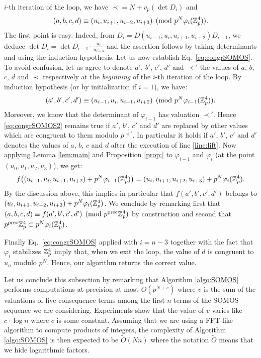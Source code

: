 \documentclass{amsart}
\begin{document}
$i$-th iteration of the loop, we have $\prec = N + v_p(\det D_i)$ and
\begin{equation}
\label{eq:congrSOMOS}
(a, b, c, d) \equiv (u_i, u_{i+1}, u_{i+2}, u_{i+3}) \pmod
{p^N \varphi_i(\mathbb Z_p^4)}.
\end{equation}
The first point is easy. Indeed, from $D_i = D(u_{i-1}, u_i, u_{i+1}, 
u_{i+2}) D_{i-1}$, we deduce $\det D_i = \det D_{i-1} \cdot 
\frac{u_i}{u_{i-3}}$ and the assertion follows by taking determinants
and using the induction hypothesis. 
Let us now establish Eq.~\eqref{eq:congrSOMOS}. To avoid confusion, 
let us agree to denote $a'$, $b'$, $c'$, $d'$ and $\prec'$ the values of 
$a$, $b$, $c$, $d$ and $\prec$ respectively at the \emph{beginning} of 
the $i$-th iteration of the loop. By induction hypothesis (or by 
initialization if $i = 1$), we have:
\begin{equation}
\label{eq:congrSOMOS2}
(a', b', c', d') \equiv (u_{i-1}, u_i, u_{i+1}, u_{i+2}) \pmod
{p^N \varphi_{i-1}(\mathbb Z_p^4)}.
\end{equation}
Moreover, we know that the determinant of $\varphi_{i-1}$ has valuation
$\prec'$. Hence \eqref{eq:congrSOMOS2} remains true if $a'$, $b'$, $c'$
and $d'$ are replaced by other values which are congruent to them modulo
$p^{\prec'}$. In particular it holds if $a'$, $b'$, $c'$ and $d'$ denotes
the values of $a$, $b$, $c$ and $d$ after the execution of line
\ref{line:lift}. Now applying Lemma \ref{lem:main} and Proposition
\ref{prop:} to $\varphi_{i-1}$ and $\varphi_i$ (at the point $(u_0,
u_1, u_2, u_3)$), we get:
$$f\big((u_{i-1}, u_i, u_{i+1}, u_{i+2}) + p^N \varphi_{i-1}(\mathbb Z_p^4)\big)
= (u_i, u_{i+1}, u_{i+2}, u_{i+3}) + p^N \varphi_i(\mathbb Z_p^4).$$
By the discussion above, this implies in particular that $f(a',b',c',d')$
belongs to $(u_i, u_{i+1}, u_{i+2}, u_{i+3}) + p^N \varphi_i(\mathbb Z_p^4)$. We
conclude by remarking first that $(a,b,c,d) \equiv f(a',b',c',d') \pmod 
{p^{\text{\rm prec}} \mathbb Z_p^4}$ by construction and second that $p^{\text{\rm prec}} \mathbb Z_p^4 \subset
p^N \varphi_i(\mathbb Z_p^4)$.

Finally Eq.~\eqref{eq:congrSOMOS} applied with $i = n-3$ together with
the fact that $\varphi_i$ stabilizes $\mathbb Z_p^4$ imply that, when we exit
the loop, the value of $d$ is congruent to $u_n$ modulo $p^N$. Hence,
our algorithm returns the correct value.

\medskip

Let us conclude this subsection by remarking that Algorithm 
\ref{algo:SOMOS} performs computations at precision at most $O(p^{N+v})$ 
where $v$ is the sum of the valuations of five consequence terms among 
the first $n$ terms of the SOMOS sequence we are considering. 
Experiments show that the value of $v$ varies like $c \cdot \log n$ 
where $c$ is some constant. Assuming that we are using a FFT-like 
algorithm to compute products of integers, the complexity of Algorithm 
\ref{algo:SOMOS} is then expected to be $\tilde O(N n)$ where the 
notation $\tilde O$ means that we hide logarithmic factors.
\end{document}
